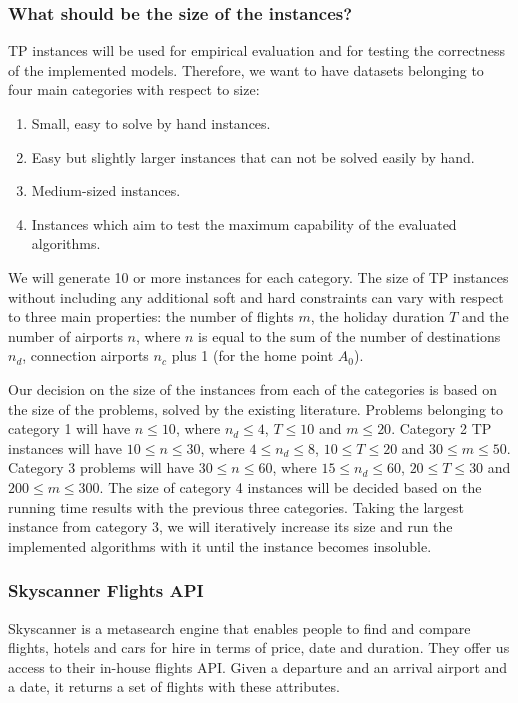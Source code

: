 \documentclass{mprop}
\theoremstyle{definition}
\begin{document}
\subsubsection*{What should be the size of the instances?}
TP instances will be used for empirical evaluation and for testing the correctness of the implemented models. Therefore, we want to have datasets belonging to four main categories with respect to size:

\begin{enumerate}
\item Small, easy to solve by hand instances.
\item Easy but slightly larger instances that can not be solved easily by hand.
\item Medium-sized instances.
\item Instances which aim to test the maximum capability of the evaluated algorithms.
\end{enumerate}

We will generate 10 or more instances for each category. The size of TP instances without including any additional soft and hard constraints can vary with respect to three main properties: the number of flights $m$, the holiday duration $T$ and the number of airports $n$, where $n$ is equal to the sum of the number of destinations $n_{d}$, connection airports $n_{c}$ plus 1 (for the home point $A_{0}$).

Our decision on the size of the instances from each of the categories is based on  the size of the problems, solved by the existing literature. Problems belonging to category 1 will have $n \leq 10$, where $n_{d} \leq 4$, $T \leq 10$ and $m \leq 20$. Category 2 TP instances will have $10 \leq n \leq 30$, where $4 \leq n_{d} \leq 8$, $10 \leq T \leq 20$ and $30 \leq m \leq 50$. Category 3 problems will have $30 \leq n \leq 60$, where $15 \leq n_{d} \leq 60$, $20 \leq T \leq 30$ and $200 \leq m \leq 300$. The size of category 4 instances will be decided based on the running time results with the previous three categories. Taking the largest instance from category 3, we will iteratively increase its size and run the implemented algorithms with it until the instance becomes insoluble.


\subsubsection*{Skyscanner Flights API}
Skyscanner is a metasearch engine that enables people to find and compare flights, hotels and cars for hire in terms of price, date and duration.
They offer us access to their in-house flights API. Given a departure and an arrival airport and a date, it returns a set of flights with these attributes.
\end{document}
